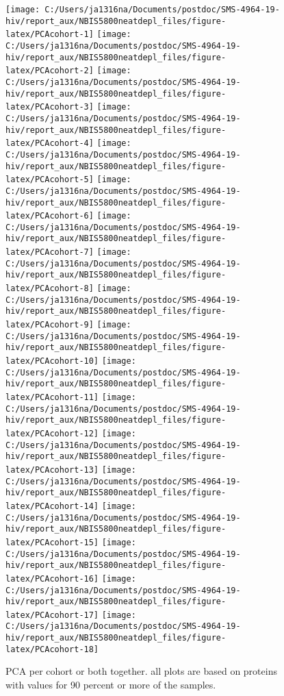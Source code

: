 \documentclass[
]{article}
\begin{document}
\begin{figure}
\texttt{[image: C:/Users/ja1316na/Documents/postdoc/SMS-4964-19-hiv/report\_aux/NBIS5800neatdepl\_files/figure-latex/PCAcohort-1]} \texttt{[image: C:/Users/ja1316na/Documents/postdoc/SMS-4964-19-hiv/report\_aux/NBIS5800neatdepl\_files/figure-latex/PCAcohort-2]} \texttt{[image: C:/Users/ja1316na/Documents/postdoc/SMS-4964-19-hiv/report\_aux/NBIS5800neatdepl\_files/figure-latex/PCAcohort-3]} \texttt{[image: C:/Users/ja1316na/Documents/postdoc/SMS-4964-19-hiv/report\_aux/NBIS5800neatdepl\_files/figure-latex/PCAcohort-4]} \texttt{[image: C:/Users/ja1316na/Documents/postdoc/SMS-4964-19-hiv/report\_aux/NBIS5800neatdepl\_files/figure-latex/PCAcohort-5]} \texttt{[image: C:/Users/ja1316na/Documents/postdoc/SMS-4964-19-hiv/report\_aux/NBIS5800neatdepl\_files/figure-latex/PCAcohort-6]} \texttt{[image: C:/Users/ja1316na/Documents/postdoc/SMS-4964-19-hiv/report\_aux/NBIS5800neatdepl\_files/figure-latex/PCAcohort-7]} \texttt{[image: C:/Users/ja1316na/Documents/postdoc/SMS-4964-19-hiv/report\_aux/NBIS5800neatdepl\_files/figure-latex/PCAcohort-8]} \texttt{[image: C:/Users/ja1316na/Documents/postdoc/SMS-4964-19-hiv/report\_aux/NBIS5800neatdepl\_files/figure-latex/PCAcohort-9]} \texttt{[image: C:/Users/ja1316na/Documents/postdoc/SMS-4964-19-hiv/report\_aux/NBIS5800neatdepl\_files/figure-latex/PCAcohort-10]} \texttt{[image: C:/Users/ja1316na/Documents/postdoc/SMS-4964-19-hiv/report\_aux/NBIS5800neatdepl\_files/figure-latex/PCAcohort-11]} \texttt{[image: C:/Users/ja1316na/Documents/postdoc/SMS-4964-19-hiv/report\_aux/NBIS5800neatdepl\_files/figure-latex/PCAcohort-12]} \texttt{[image: C:/Users/ja1316na/Documents/postdoc/SMS-4964-19-hiv/report\_aux/NBIS5800neatdepl\_files/figure-latex/PCAcohort-13]} \texttt{[image: C:/Users/ja1316na/Documents/postdoc/SMS-4964-19-hiv/report\_aux/NBIS5800neatdepl\_files/figure-latex/PCAcohort-14]} \texttt{[image: C:/Users/ja1316na/Documents/postdoc/SMS-4964-19-hiv/report\_aux/NBIS5800neatdepl\_files/figure-latex/PCAcohort-15]} \texttt{[image: C:/Users/ja1316na/Documents/postdoc/SMS-4964-19-hiv/report\_aux/NBIS5800neatdepl\_files/figure-latex/PCAcohort-16]} \texttt{[image: C:/Users/ja1316na/Documents/postdoc/SMS-4964-19-hiv/report\_aux/NBIS5800neatdepl\_files/figure-latex/PCAcohort-17]} \texttt{[image: C:/Users/ja1316na/Documents/postdoc/SMS-4964-19-hiv/report\_aux/NBIS5800neatdepl\_files/figure-latex/PCAcohort-18]} \caption{PCA per cohort or both together. all plots are based on proteins with values for 90 percent or more of the samples.}\label{fig:PCAcohort}
\end{figure}
\end{document}
